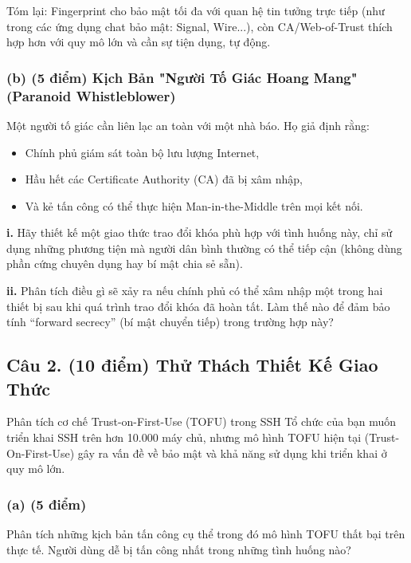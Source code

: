 \vspace{0.2cm}
Tóm lại: Fingerprint cho bảo mật tối đa với quan hệ tin tưởng trực tiếp (như trong các ứng dụng chat bảo mật: Signal, Wire...), còn CA/Web-of-Trust thích hợp hơn với quy mô lớn và cần sự tiện dụng, tự động.


\subsubsection{(b) (5 điểm) Kịch Bản "Người Tố Giác Hoang Mang" (Paranoid Whistleblower)}

Một người tố giác cần liên lạc an toàn với một nhà báo.
Họ giả định rằng:
\begin{itemize}
    \item Chính phủ giám sát toàn bộ lưu lượng Internet,
    \item Hầu hết các Certificate Authority (CA) đã bị xâm nhập,
    \item Và kẻ tấn công có thể thực hiện Man-in-the-Middle trên mọi kết nối.
\end{itemize}

\textbf{i.} Hãy thiết kế một giao thức trao đổi khóa phù hợp với tình huống này,
chỉ sử dụng những phương tiện mà người dân bình thường có thể tiếp cận (không dùng phần cứng chuyên dụng hay bí mật chia sẻ sẵn).

\textbf{ii.} Phân tích điều gì sẽ xảy ra nếu chính phủ có thể xâm nhập một trong hai thiết bị sau khi quá trình trao đổi khóa đã hoàn tất.
Làm thế nào để đảm bảo tính ``forward secrecy'' (bí mật chuyển tiếp) trong trường hợp này?

\subsection{Câu 2. (10 điểm) Thử Thách Thiết Kế Giao Thức}

Phân tích cơ chế Trust-on-First-Use (TOFU) trong SSH
Tổ chức của bạn muốn triển khai SSH trên hơn 10.000 máy chủ,
nhưng mô hình TOFU hiện tại (Trust-On-First-Use) gây ra vấn đề về bảo mật và khả năng sử dụng khi triển khai ở quy mô lớn.

\subsubsection{(a) (5 điểm)}

Phân tích những kịch bản tấn công cụ thể trong đó mô hình TOFU thất bại trên thực tế.
Người dùng dễ bị tấn công nhất trong những tình huống nào?

